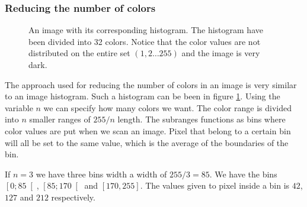 \documentclass[a4paper, 10pt, final]{article}
\begin{document}
\subsubsection*{Reducing the number of colors}
\begin{figure}[!h]
    \centering
    \caption[]{An image with its corresponding histogram. The histogram
    have been divided into 32 colors. Notice that the color values are
    not distributed on the entire set $(1,2\dots 255)$ and the image is
    very dark.}
    \label{dark_image}
\end{figure}

The approach used for reducing the number of colors in an image is very
similar to an image histogram. Such a histogram can be been in figure
\ref{dark_image}. Using the variable $n$ we can specify how many colors
we want. The color range is divided into $n$ smaller ranges of $255/n$
length. The subranges functions as bins where color values are put when
we scan an image. Pixel that belong to a certain bin will all be set to
the same value, which is the average of the boundaries of the bin.

If $n = 3$ we have three bins width a width of $255/3 = 85$. We have the
bins $\left[0; 85\right[$, $\left[85; 170\right[$ and $\left[170,
255\right]$.  The values given to pixel inside a bin is $42$, $127$ and
$212$ respectively.
\end{document}
